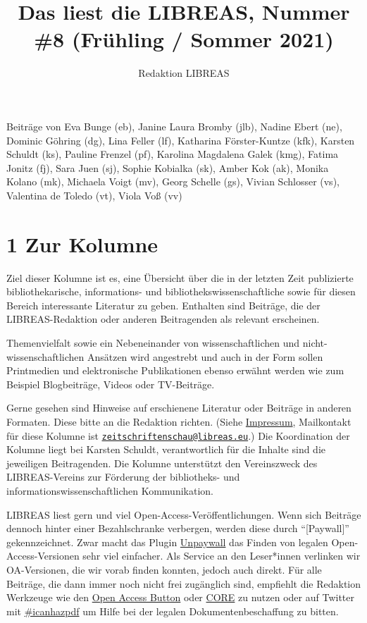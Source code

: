 \documentclass[a4paper,
fontsize=11pt,
oneside,
numbers=noperiodatend,
parskip=half-,
bibliography=totoc,
final
]{scrartcl}
\title{\LARGE{Das liest die LIBREAS, Nummer \#8 (Frühling / Sommer 2021)}}%
\author{Redaktion LIBREAS} %
\date{}
\begin{document}
\maketitle
\thispagestyle{fancyplain} 


Beiträge von Eva Bunge (eb), Janine Laura Bromby (jlb), Nadine Ebert
(ne), Dominic Göhring (dg), Lina Feller (lf), Katharina Förster-Kuntze
(kfk), Karsten Schuldt (ks), Pauline Frenzel (pf), Karolina Magdalena
Galek (kmg), Fatima Jonitz (fj), Sara Juen (sj), Sophie Kobialka (sk),
Amber Kok (ak), Monika Kolano (mk), Michaela Voigt (mv), Georg Schelle
(gs), Vivian Schlosser (vs), Valentina de Toledo (vt), Viola Voß (vv)

\hypertarget{zur-kolumne}{%
\section{1 Zur Kolumne}\label{zur-kolumne}}

Ziel dieser Kolumne ist es, eine Übersicht über die in der letzten Zeit
publizierte bibliothekarische, informations- und
bibliothekswissenschaftliche sowie für diesen Bereich interessante
Literatur zu geben. Enthalten sind Beiträge, die der LIBREAS-Redaktion
oder anderen Beitragenden als relevant erscheinen.

Themenvielfalt sowie ein Nebeneinander von wissenschaftlichen und
nicht-wissenschaftlichen Ansätzen wird angestrebt und auch in der Form
sollen Printmedien und elektronische Publikationen ebenso erwähnt werden
wie zum Beispiel Blogbeiträge, Videos oder TV-Beiträge.

Gerne gesehen sind Hinweise auf erschienene Literatur oder Beiträge in
anderen Formaten. Diese bitte an die Redaktion richten. (Siehe
\href{http://libreas.eu/about/}{Impressum}, Mailkontakt für diese
Kolumne ist
\href{mailto:zeitschriftenschau@libreas.eu}{\nolinkurl{zeitschriftenschau@libreas.eu}}.)
Die Koordination der Kolumne liegt bei Karsten Schuldt, verantwortlich
für die Inhalte sind die jeweiligen Beitragenden. Die Kolumne
unterstützt den Vereinszweck des LIBREAS-Vereins zur Förderung der
bibliotheks- und informationswissenschaftlichen Kommunikation.

LIBREAS liest gern und viel Open-Access-Veröffentlichungen. Wenn sich
Beiträge dennoch hinter einer Bezahlschranke verbergen, werden diese
durch \enquote{{[}Paywall{]}} gekennzeichnet. Zwar macht das Plugin
\href{http://unpaywall.org/}{Unpaywall} das Finden von legalen
Open-Access-Versionen sehr viel einfacher. Als Service an den
Leser*innen verlinken wir OA-Versionen, die wir vorab finden konnten,
jedoch auch direkt. Für alle Beiträge, die dann immer noch nicht frei
zugänglich sind, empfiehlt die Redaktion Werkzeuge wie den
\href{https://openaccessbutton.org/}{Open Access Button} oder
\href{https://core.ac.uk/services/discovery/}{CORE} zu nutzen oder auf
Twitter mit
\href{https://twitter.com/hashtag/icanhazpdf?src=hash}{\#icanhazpdf} um
Hilfe bei der legalen Dokumentenbeschaffung zu bitten.
\end{document}
